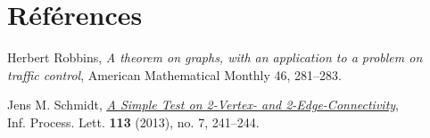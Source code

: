 \documentclass{article}      %
\begin{document}
\section{Références}
\begin{thebibliography}{9}
Herbert Robbins, \textit{A theorem on graphs, with an application to a problem on traffic control}, American Mathematical Monthly 46, 281–283.

Jens M. Schmidt, \href{https://arxiv.org/ftp/arxiv/papers/1209/1209.0700.pdf}{\underline{\textit{A Simple Test on 2-Vertex- and 2-Edge-Connectivity}}},
\\Inf. Process. Lett. \textbf{113} (2013), no. 7, 241–244.
\end{thebibliography}
\end{document}
